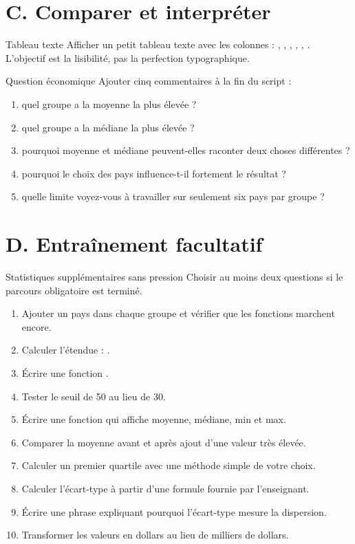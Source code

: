 \documentclass[11pt,a4paper]{article}
\begin{document}
\section*{C. Comparer et interpréter}

\begin{mandatoryexercise}{Tableau texte}
Afficher un petit tableau texte avec les colonnes : , , , , , . L'objectif est la lisibilité, pas la perfection typographique.
\end{mandatoryexercise}

\begin{mandatoryexercise}{Question économique}
Ajouter cinq commentaires à la fin du script :
\begin{enumerate}
  \item quel groupe a la moyenne la plus élevée ?
  \item quel groupe a la médiane la plus élevée ?
  \item pourquoi moyenne et médiane peuvent-elles raconter deux choses différentes ?
  \item pourquoi le choix des pays influence-t-il fortement le résultat ?
  \item quelle limite voyez-vous à travailler sur seulement six pays par groupe ?
\end{enumerate}
\end{mandatoryexercise}

\section*{D. Entraînement facultatif}

\begin{extensionexercise}{Statistiques supplémentaires sans pression}
Choisir au moins deux questions si le parcours obligatoire est terminé.
\begin{enumerate}
  \item Ajouter un pays dans chaque groupe et vérifier que les fonctions marchent encore.
  \item Calculer l'étendue : .
  \item Écrire une fonction .
  \item Tester le seuil de 50 au lieu de 30.
  \item Écrire une fonction  qui affiche moyenne, médiane, min et max.
  \item Comparer la moyenne avant et après ajout d'une valeur très élevée.
  \item Calculer un premier quartile avec une méthode simple de votre choix.
  \item Calculer l'écart-type à partir d'une formule fournie par l'enseignant.
  \item Écrire une phrase expliquant pourquoi l'écart-type mesure la dispersion.
  \item Transformer les valeurs en dollars au lieu de milliers de dollars.
\end{enumerate}
\end{extensionexercise}
\end{document}

